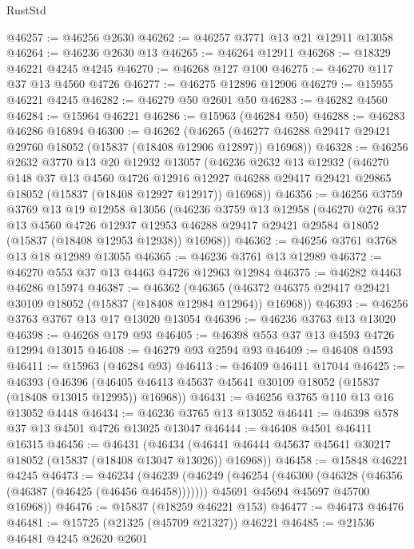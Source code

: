 \begin{lexlean}{RustStd}
\begin{coremodule}
@46257 := @46256 @2630
@46262 := @46257 @3771 @13 @21 @12911 @13058
@46264 := @46236 @2630 @13
@46265 := @46264 @12911
@46268 := @18329 @46221 @4245 @4245
@46270 := @46268 @127 @100
@46275 := @46270 @117 @37 @13 @4560 @4726
@46277 := @46275 @12896 @12906
@46279 := @15955 @46221 @4245
@46282 := @46279 @50 @2601 @50
@46283 := @46282 @4560
@46284 := @15964 @46221
@46286 := @15963 (@46284 @50)
@46288 := @46283 @46286 @16894
@46300 := @46262
    (@46265 (@46277 @46288 @29417 @29421 @29760 @18052 (@15837 (@18408 @12906 @12897)) @16968))
@46328 := @46256
    @2632
    @3770
    @13
    @20
    @12932
    @13057
    (@46236
      @2632
      @13
      @12932
      (@46270
        @148
        @37
        @13
        @4560
        @4726
        @12916
        @12927
        @46288
        @29417
        @29421
        @29865
        @18052
        (@15837 (@18408 @12927 @12917))
        @16968))
@46356 := @46256
    @3759
    @3769
    @13
    @19
    @12958
    @13056
    (@46236
      @3759
      @13
      @12958
      (@46270
        @276
        @37
        @13
        @4560
        @4726
        @12937
        @12953
        @46288
        @29417
        @29421
        @29584
        @18052
        (@15837 (@18408 @12953 @12938))
        @16968))
@46362 := @46256 @3761 @3768 @13 @18 @12989 @13055
@46365 := @46236 @3761 @13 @12989
@46372 := @46270 @553 @37 @13 @4463 @4726 @12963 @12984
@46375 := @46282 @4463 @46286 @15974
@46387 := @46362
    (@46365 (@46372 @46375 @29417 @29421 @30109 @18052 (@15837 (@18408 @12984 @12964)) @16968))
@46393 := @46256 @3763 @3767 @13 @17 @13020 @13054
@46396 := @46236 @3763 @13 @13020
@46398 := @46268 @179 @93
@46405 := @46398 @553 @37 @13 @4593 @4726 @12994 @13015
@46408 := @46279 @93 @2594 @93
@46409 := @46408 @4593
@46411 := @15963 (@46284 @93)
@46413 := @46409 @46411 @17044
@46425 := @46393
    (@46396 (@46405 @46413 @45637 @45641 @30109 @18052 (@15837 (@18408 @13015 @12995)) @16968))
@46431 := @46256 @3765 @110 @13 @16 @13052 @4448
@46434 := @46236 @3765 @13 @13052
@46441 := @46398 @578 @37 @13 @4501 @4726 @13025 @13047
@46444 := @46408 @4501 @46411 @16315
@46456 := @46431
    (@46434 (@46441 @46444 @45637 @45641 @30217 @18052 (@15837 (@18408 @13047 @13026)) @16968))
@46458 := @15848 @46221 @4245
@46473 := @46234
    (@46239
      (@46249
        (@46254 (@46300 (@46328 (@46356 (@46387 (@46425 (@46456 @46458)))))))
        @45691
        @45694
        @45697
        @45700
        @16968))
@46476 := @15837 (@18259 @46221 @153)
@46477 := @46473 @46476
@46481 := @15725 (@21325 (@45709 @21327)) @46221
@46485 := @21536 @46481 @4245 @2620 @2601

\end{coremodule}
\end{lexlean}
